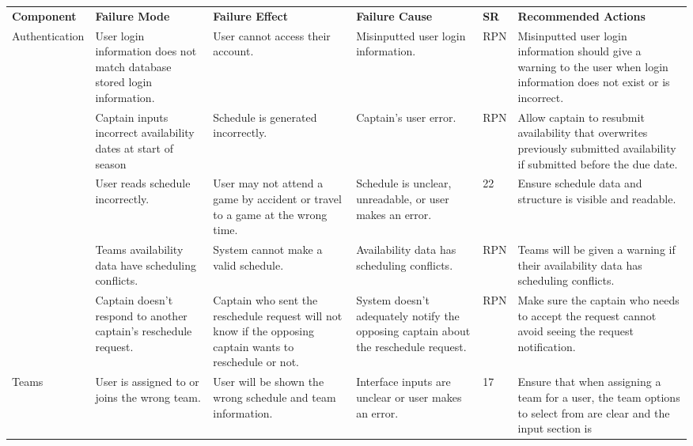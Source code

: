 \documentclass{article}
\begin{document}
\begin{landscape}
\vspace*{-3.25cm}
\hspace*{-3.25cm}
\def\arraystretch{1.3}
\begin{tabularx}{504pt}{|p{3cm}||p{4cm}|p{4cm}|p{4cm}|p{1cm}|p{5.75cm}|}
\cline{1-6}
\textbf{Component} & \textbf{Failure Mode} & \textbf{Failure Effect} & \textbf{Failure Cause} & \textbf{SR} & \textbf{Recommended Actions}\\
\cline{1-6}
\multirow{2}{2cm}{Authentication} & User login information does not match database stored
login information. & User cannot access their account. & Misinputted user login information.
& RPN & Misinputted user login information should give a warning to the user when
login information does not exist or is incorrect.\\
\cline{1-6}
\multirow{2}{2cm}{Scheduling} & Captain inputs incorrect availability dates at
start of season & Schedule is generated incorrectly. & Captain's user error. &
RPN & Allow captain to resubmit availability that overwrites previously
submitted availability if submitted before the due date.\\
\cline{2-6}
& User reads schedule incorrectly. & User may not attend a game by accident or
travel to a game at the wrong time. & Schedule is unclear, unreadable, or user
makes an error. & 22 & Ensure schedule data and structure is visible and
readable.\\
\cline{2-6}
& Teams availability data have scheduling conflicts. & System cannot make a
valid schedule. & Availability data has scheduling conflicts. & RPN & Teams
will be given a warning if their availability data has scheduling conflicts.\\
\cline{2-6}
& Captain doesn't respond to another captain's reschedule request. & Captain
who sent the reschedule request will not know if the opposing captain wants to
reschedule or not. & System doesn't adequately notify the opposing captain
about the reschedule request. & RPN & Make sure the captain who needs to
accept the request cannot avoid seeing the request notification.\\
\cline{1-6}
\multirow{2}{2cm}{Teams} & User is assigned to or joins the wrong team. & User
will be shown the wrong schedule and team information. & Interface inputs are
unclear or user makes an error. & 17 & Ensure that when assigning a team for a
user, the team options to select from are clear and the input section is

\end{tabularx}
\end{landscape}
\end{document}
